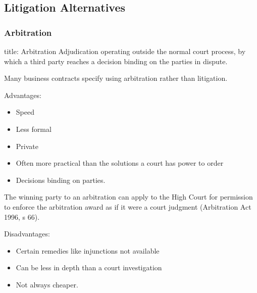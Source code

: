 \documentclass[
]{article}
\newenvironment{Shaded}{}{}
\newcommand{\NormalTok}[1]{#1}
\providecommand{\tightlist}{%
  \setlength{\itemsep}{0pt}\setlength{\parskip}{0pt}}
\begin{document}
\hypertarget{litigation-alternatives}{%
\subsection{Litigation Alternatives}\label{litigation-alternatives}}

\hypertarget{arbitration}{%
\subsubsection{Arbitration}\label{arbitration}}

\begin{Shaded}
\begin{Highlighting}[]
\NormalTok{title: Arbitration}
\NormalTok{Adjudication operating outside the normal court process, by which a third party reaches a decision binding on the parties in dispute. }
\end{Highlighting}
\end{Shaded}

Many business contracts specify using arbitration rather than
litigation.

Advantages:

\begin{itemize}
\tightlist
\item
  Speed
\item
  Less formal
\item
  Private
\item
  Often more practical than the solutions a court has power to order
\item
  Decisions binding on parties.
\end{itemize}

\begin{Shaded}
\begin{Highlighting}[]
\NormalTok{The winning party to an arbitration can apply to the High Court for permission to enforce the arbitration award as if it were a court judgment (Arbitration Act 1996, s 66).}
\end{Highlighting}
\end{Shaded}

Disadvantages:

\begin{itemize}
\tightlist
\item
  Certain remedies like injunctions not available
\item
  Can be less in depth than a court investigation
\item
  Not always cheaper.
\end{itemize}
\end{document}
